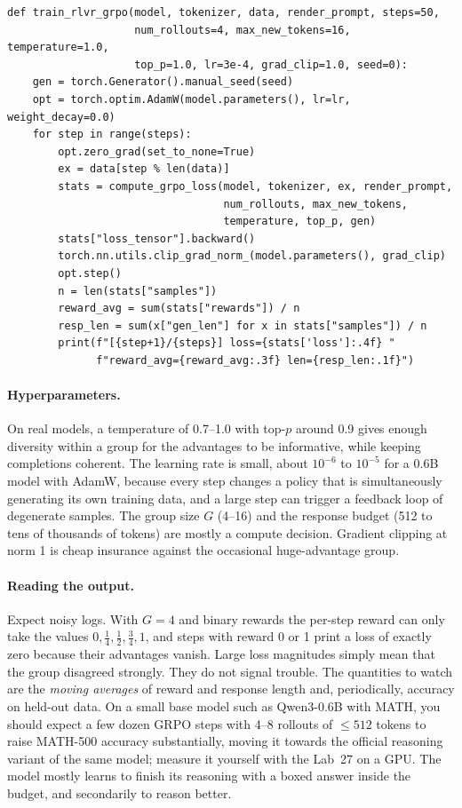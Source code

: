 \begin{lstlisting}[caption={The training loop (abridged from \texttt{train\_rlvr\_grpo}; CSV logging and checkpointing elided).},label={lst:grpo:loop}]
def train_rlvr_grpo(model, tokenizer, data, render_prompt, steps=50,
                    num_rollouts=4, max_new_tokens=16, temperature=1.0,
                    top_p=1.0, lr=3e-4, grad_clip=1.0, seed=0):
    gen = torch.Generator().manual_seed(seed)
    opt = torch.optim.AdamW(model.parameters(), lr=lr, weight_decay=0.0)
    for step in range(steps):
        opt.zero_grad(set_to_none=True)
        ex = data[step % len(data)]
        stats = compute_grpo_loss(model, tokenizer, ex, render_prompt,
                                  num_rollouts, max_new_tokens,
                                  temperature, top_p, gen)
        stats["loss_tensor"].backward()
        torch.nn.utils.clip_grad_norm_(model.parameters(), grad_clip)
        opt.step()
        n = len(stats["samples"])
        reward_avg = sum(stats["rewards"]) / n
        resp_len = sum(x["gen_len"] for x in stats["samples"]) / n
        print(f"[{step+1}/{steps}] loss={stats['loss']:.4f} "
              f"reward_avg={reward_avg:.3f} len={resp_len:.1f}")
\end{lstlisting}

\paragraph{Hyperparameters.} On real models, a temperature of 0.7--1.0 with top-$p$
around 0.9 gives enough diversity within a group for the advantages to be informative,
while keeping completions coherent. The learning rate is small, about $10^{-6}$ to
$10^{-5}$ for a 0.6B model with AdamW, because every step changes a policy that is
simultaneously generating its own training data, and a large step can trigger a feedback
loop of degenerate samples. The group size $G$ (4--16) and the response budget (512 to
tens of thousands of tokens) are mostly a compute decision. Gradient clipping at norm 1 is
cheap insurance against the occasional huge-advantage group.

\paragraph{Reading the output.} Expect noisy logs. With $G=4$ and binary rewards the
per-step reward can only take the values $0,\frac14,\frac12,\frac34,1$, and steps with
reward 0 or 1 print a loss of exactly zero because their advantages vanish. Large loss
magnitudes simply mean that the group disagreed strongly. They do not signal trouble. The
quantities to watch are the \emph{moving averages} of reward and response length and,
periodically, accuracy on held-out data. On a small base model such as Qwen3-0.6B with MATH, you should expect
a few dozen GRPO steps with 4--8 rollouts of $\le512$ tokens to raise MATH-500 accuracy
substantially, moving it towards the official reasoning variant of the same model; measure it
yourself with the Lab~27  on a GPU. The model mostly learns to finish its reasoning with a boxed
answer inside the budget, and secondarily to reason better.


